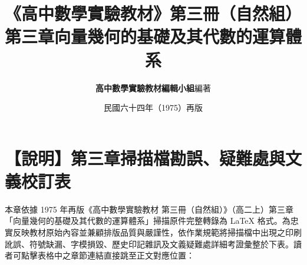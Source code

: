 \documentclass[a4paper,12pt,twoside]{article}
\title{\LARGE\textbf{《高中數學實驗教材》第三冊（自然組）}\\[0.5em] \Large\textbf{第三章\quad 向量幾何的基礎及其代數的運算體系}}
\author{\textbf{高中數學實驗教材編輯小組}\quad 編著}
\date{民國六十四年（1975）再版}
\begin{document}
\maketitle
\thispagestyle{firstpage}

\section*{【說明】第三章掃描檔勘誤、疑難處與文義校訂表}
\label{sec:errata_notes_b3_ch3}
\label{sec:current_errata}

本章依據 1975 年再版《高中數學實驗教材 第三冊（自然組）》（高二上）第三章「向量幾何的基礎及其代數的運算體系」掃描原件完整轉錄為 \LaTeX{} 格式。為忠實反映教材原始內容並兼顧排版品質與嚴謹性，依作業規範將掃描檔中出現之印刷訛誤、符號缺漏、字模損毀、歷史印記雜訊及文義疑難處詳細考證彙整於下表。讀者可點擊表格中之章節連結直接跳至正文對應位置：
\end{document}
